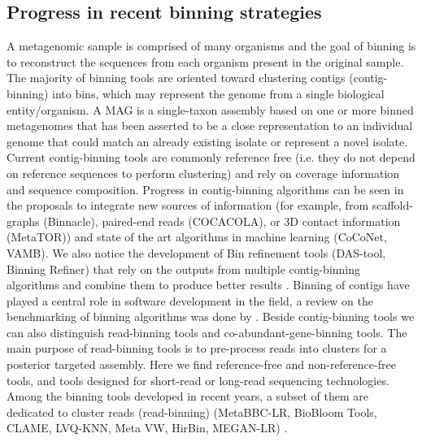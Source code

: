 \documentclass{article}
\begin{document}
\subsection{Progress in recent binning strategies}
A metagenomic sample is comprised of many organisms and the goal of binning is to reconstruct the sequences from each organism present in the original sample.
The majority of binning tools are oriented toward clustering contigs (contig-binning) into bins, which may represent the genome from a single biological entity/organism.
A \gls{MAG} is a single-taxon assembly based on one or more binned metagenomes that has been asserted to be a close representation to an individual genome that could match an already existing isolate or represent a novel isolate.
Current contig-binning tools are commonly reference free (i.e. they do not depend on reference sequences to perform clustering) and rely on coverage information and sequence composition.
Progress in contig-binning algorithms can be seen in the proposals to integrate new sources of information (for example, from scaffold-graphs (Binnacle), paired-end reads (COCACOLA), or 3D contact information (MetaTOR)) and state of the art algorithms in machine learning (CoCoNet, VAMB).
We also notice the development of Bin refinement tools (DAS-tool, Binning Refiner) that rely on the outputs from multiple contig-binning algorithms and combine them to produce better results \cite{sieber2018recovery}.
Binning of contigs have played a central role in software development in the field, a review on the benchmarking of binning algorithms was done by . 
Beside contig-binning tools we can also distinguish read-binning tools and co-abundant-gene-binning tools.
The main purpose of read-binning tools is to pre-process reads into clusters for a posterior targeted assembly.
Here we find reference-free and non-reference-free tools, and tools designed for short-read or long-read sequencing technologies.
Among the binning tools developed in recent years, a subset of them are dedicated to cluster reads (read-binning) (MetaBBC-LR, BioBloom Tools, CLAME, LVQ-KNN, Meta VW, HirBin, MEGAN-LR) \cite{wickramarachchi2020metabcc, chu2014biobloom, benavides2018clame, belka2018lvq, vervier2016large, osterlund2017hirbin, huson2018megan}.
\end{document}
